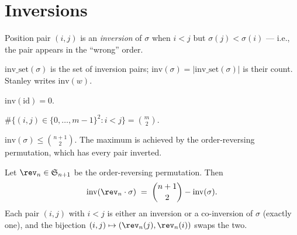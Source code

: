 \section{Inversions}

\begin{definition}
  \label{def:is_inv}
  \rocqok
  Position pair $(i, j)$ is an \emph{inversion} of $\sigma$ when
  $i < j$ but $\sigma(j) < \sigma(i)$ — i.e., the pair appears in the
  ``wrong'' order.
\end{definition}

\begin{definition}
  \label{def:inv}
  \rocqok
  $\mathrm{inv\_set}(\sigma)$ is the set of inversion pairs;
  $\mathrm{inv}(\sigma) = |\mathrm{inv\_set}(\sigma)|$ is their count.
  Stanley writes $\mathrm{inv}(w)$.
\end{definition}

\begin{lemma}
  \label{lem:inv_id}
  \rocqok
  $\mathrm{inv}(\mathrm{id}) = 0$.
\end{lemma}

\begin{lemma}
  \label{lem:card_ord_pair}
  \rocqok
  $\#\{(i, j) \in \{0, \dots, m-1\}^2 : i < j\} = \binom{m}{2}$.
\end{lemma}

\begin{lemma}
  \label{lem:inv_le}
  \rocqok
  $\mathrm{inv}(\sigma) \leq \binom{n+1}{2}$.  The maximum is achieved by
  the order-reversing permutation, which has every pair inverted.
\end{lemma}

\begin{theorem}
  \label{thm:inv_rev_perm}
  \rocqok
  Let $\rev_n \in \Snp{n+1}$ be the order-reversing permutation.  Then
  \[
    \mathrm{inv}(\rev_n \cdot \sigma) \;=\; \binom{n+1}{2} - \mathrm{inv}(\sigma).
  \]
  Each pair $(i, j)$ with $i < j$ is either an inversion or a
  co-inversion of $\sigma$ (exactly one), and the bijection
  $(i, j) \mapsto (\rev_n(j), \rev_n(i))$ swaps the two.
\end{theorem}


